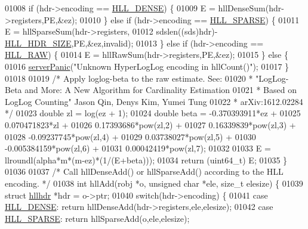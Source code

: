 \begin{DoxyCode}
{{01008     \textcolor{keywordflow}{if} (hdr->encoding == \hyperlink{hyperloglog_8c_a5f2ead2492fc9cc4ff39f8c1752875a1}{HLL\_DENSE}) \{
01009         E = hllDenseSum(hdr->registers,PE,&ez);
01010     \} \textcolor{keywordflow}{else} \textcolor{keywordflow}{if} (hdr->encoding == \hyperlink{hyperloglog_8c_afe326d57dd3d7c27c8fe52dc2c19cecd}{HLL\_SPARSE}) \{
01011         E = hllSparseSum(hdr->registers,
01012                          sdslen((sds)hdr)-\hyperlink{hyperloglog_8c_af04dc163054c4c79b0e6c93057b4032f}{HLL\_HDR\_SIZE},PE,&ez,invalid);
01013     \} \textcolor{keywordflow}{else} \textcolor{keywordflow}{if} (hdr->encoding == \hyperlink{hyperloglog_8c_aafa7fcced873855fe756c6e29831114a}{HLL\_RAW}) \{
01014         E = hllRawSum(hdr->registers,PE,&ez);
01015     \} \textcolor{keywordflow}{else} \{
01016         \hyperlink{server_8h_a11cc378e7778a830b41240578de3b204}{serverPanic}(\textcolor{stringliteral}{"Unknown HyperLogLog encoding in hllCount()"});
01017     \}
01018 
01019     \textcolor{comment}{/* Apply loglog-beta to the raw estimate. See:}
01020 \textcolor{comment}{     * "LogLog-Beta and More: A New Algorithm for Cardinality Estimation}
01021 \textcolor{comment}{     * Based on LogLog Counting" Jason Qin, Denys Kim, Yumei Tung}
01022 \textcolor{comment}{     * arXiv:1612.02284 */}
01023     \textcolor{keywordtype}{double} zl = log(ez + 1);
01024     \textcolor{keywordtype}{double} beta = -0.370393911*ez +
01025                    0.070471823*zl +
01026                    0.17393686*pow(zl,2) +
01027                    0.16339839*pow(zl,3) +
01028                   -0.09237745*pow(zl,4) +
01029                    0.03738027*pow(zl,5) +
01030                   -0.005384159*pow(zl,6) +
01031                    0.00042419*pow(zl,7);
01032 
01033     E  = llroundl(alpha*m*(m-ez)*(1/(E+beta)));
01034     \textcolor{keywordflow}{return} (uint64\_t) E;
01035 \}
01036 
01037 \textcolor{comment}{/* Call hllDenseAdd() or hllSparseAdd() according to the HLL encoding. */}
01038 \textcolor{keywordtype}{int} hllAdd(robj *o, \textcolor{keywordtype}{unsigned} \textcolor{keywordtype}{char} *ele, size\_t elesize) \{
01039     \textcolor{keyword}{struct} \hyperlink{structhllhdr}{hllhdr} *hdr = o->ptr;
01040     \textcolor{keywordflow}{switch}(hdr->encoding) \{
01041     \textcolor{keywordflow}{case} \hyperlink{hyperloglog_8c_a5f2ead2492fc9cc4ff39f8c1752875a1}{HLL\_DENSE}: \textcolor{keywordflow}{return} hllDenseAdd(hdr->registers,ele,elesize);
01042     \textcolor{keywordflow}{case} \hyperlink{hyperloglog_8c_afe326d57dd3d7c27c8fe52dc2c19cecd}{HLL\_SPARSE}: \textcolor{keywordflow}{return} hllSparseAdd(o,ele,elesize);
}}
\end{DoxyCode}
